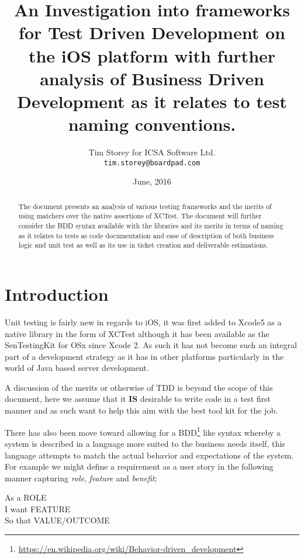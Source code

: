 \documentclass[a4paper, titlepage]{article}
\title{An Investigation into frameworks for Test Driven
Development on the iOS platform with further
analysis of Business Driven Development as it relates to test naming
conventions.}
\author{Tim Storey \hfill for \hfill ICSA Software Ltd.
        \\\texttt{tim.storey@boardpad.com}}
\date{June, 2016}
\begin{document}
\maketitle

\begin{abstract}
  The document presents an analysis of various testing frameworks
  and the merits of using matchers over the native assertions of
  XCTest. The document will further consider the  BDD syntax available with the
  libraries and its merits in terms of naming as it relates to tests as code documentation
  and ease of description of both business logic and unit test as well
  as its use in ticket creation and deliverable estimations.
  \end{abstract}

\newpage

\section{Introduction}
  \label{sec:Intro}
  Unit testing is fairly new in regards to iOS, it was first added to
  Xcode5 as a native library in the form of XCTest although it has been available
  as the SenTestingKit for OSx since Xcode 2. As such it has not become such an
  integral part of a development strategy as it has in other
  platforms particularly in the world of Java based server development.

  A discussion of the merits or otherwise of TDD is beyond the scope of
  this document, here we assume that it \textbf{IS} desirable to write
  code in a test first manner and as such want to help this aim with the best
  tool kit for the job.
  
  There has also been move toward allowing for a 
  BDD\footnote{\url{https://en.wikipedia.org/wiki/Behavior-driven_development}} 
  like syntax whereby a system is
  described in a language more suited to the business needs itself, this
  language attempts to match the actual behavior and expectations of
  the system.\\For example we might define a requirement as a user
  story in the following manner capturing \textit{role},
  \textit{feature} and \textit{benefit};

  \begin{spec}{0.5}
    \ac{As a }{ROLE}\\
    \ac{I want }{FEATURE}\\
    \ac{So that }{VALUE/OUTCOME}
  \end{spec}
\end{document}
